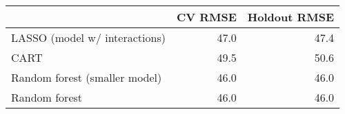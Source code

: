 
\begin{tabular}{lrr}
\toprule
  & CV RMSE & Holdout RMSE\\
\midrule
LASSO (model w/ interactions) & 47.0 & 47.4\\
CART & 49.5 & 50.6\\
Random forest (smaller model) & 46.0 & 46.0\\
Random forest & 46.0 & 46.0\\
\bottomrule
\end{tabular}